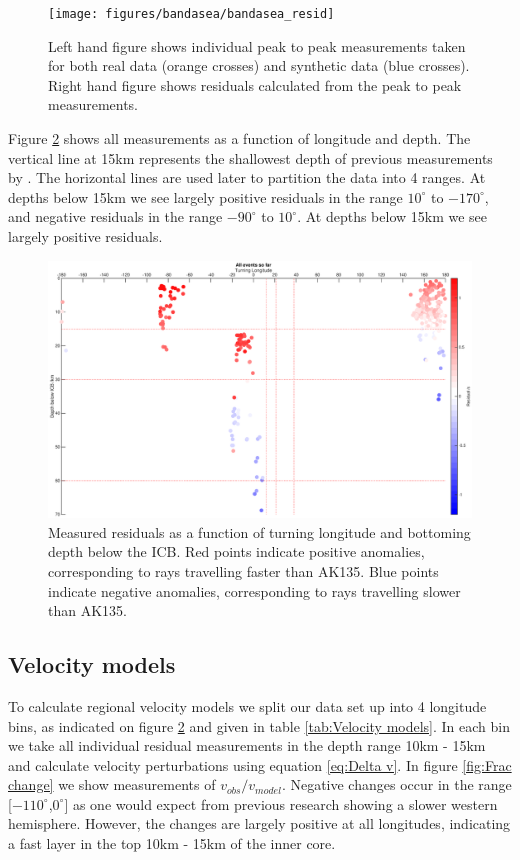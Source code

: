 \documentclass[11pt,a4paper]{article}
\begin{document}
\begin{figure}
	\centering
	\texttt{[image: figures/bandasea/bandasea\_resid]}
	\caption{Left hand figure shows individual peak to peak measurements taken for both real data (orange crosses) and synthetic data (blue crosses). Right hand figure shows residuals calculated from the peak to peak measurements.}
	\label{fig:Bandasea residuals}
\end{figure}

Figure \ref{fig:All longitude} shows all measurements as a function of longitude and depth. The vertical line at 15km represents the shallowest depth of previous measurements by \cite{Waszek2011a}. The horizontal lines are used later to partition the data into 4 ranges. At depths below 15km we see largely positive residuals in the range $10^{\circ}$ to $-170^{\circ}$, and negative residuals in the range $-90^{\circ}$ to $10^{\circ}$. At depths below 15km we see largely positive residuals.

\begin{figure}
	\centering
	\includegraphics[width=\textwidth]{figures/all_longitude}
	\caption{Measured residuals as a function of turning longitude and bottoming depth below the ICB. Red points indicate positive anomalies, corresponding to rays travelling faster than AK135. Blue points indicate negative anomalies, corresponding to rays travelling slower than AK135. }
	\label{fig:All longitude}
\end{figure}

\subsection{Velocity models}
To calculate regional velocity models we split our data set up into 4 longitude bins, as indicated on figure \ref{fig:All longitude} and given in table \ref{tab:Velocity models}. In each bin we take all individual residual measurements in the depth range 10km - 15km and calculate velocity perturbations using equation \eqref{eq:Delta v}. In figure \ref{fig:Frac change} we show measurements of $v_{obs} / v_{model}$. Negative changes occur in the range [$-110^{\circ}$,$0^{\circ}$] as one would expect from previous research showing a slower western hemisphere. However, the changes are largely positive at all longitudes, indicating a fast layer in the top 10km - 15km of the inner core.
\end{document}
